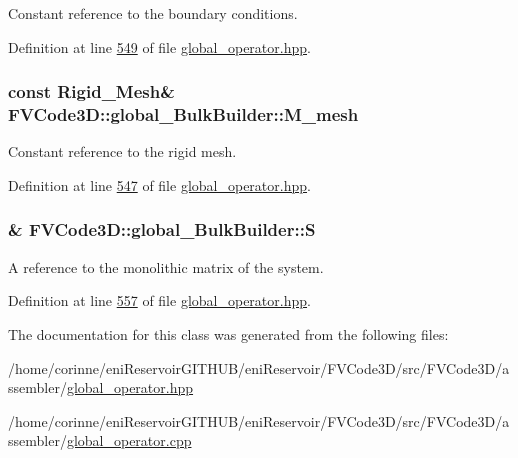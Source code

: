 Constant reference to the boundary conditions. 



Definition at line \hyperlink{global__operator_8hpp_source_l00549}{549} of file \hyperlink{global__operator_8hpp_source}{global\+\_\+operator.\+hpp}.

\subsubsection[{\texorpdfstring{M\+\_\+mesh}{M_mesh}}]{\setlength{\rightskip}{0pt plus 5cm}const {\bf Rigid\+\_\+\+Mesh}\& F\+V\+Code3\+D\+::global\+\_\+\+Bulk\+Builder\+::\+M\+\_\+mesh\hspace{0.3cm}{\ttfamily [private]}}\hypertarget{classFVCode3D_1_1global__BulkBuilder_ab7654cc72d9bb696193e1de09a8ab6c3}{}\label{classFVCode3D_1_1global__BulkBuilder_ab7654cc72d9bb696193e1de09a8ab6c3}


Constant reference to the rigid mesh. 



Definition at line \hyperlink{global__operator_8hpp_source_l00547}{547} of file \hyperlink{global__operator_8hpp_source}{global\+\_\+operator.\+hpp}.

\subsubsection[{\texorpdfstring{S}{S}}]{\& F\+V\+Code3\+D\+::global\+\_\+\+Bulk\+Builder\+::S\hspace{0.3cm}{\ttfamily [private]}}\hypertarget{classFVCode3D_1_1global__BulkBuilder_a3e29e74ddbefa92dd03bc333cc43bfd5}{}\label{classFVCode3D_1_1global__BulkBuilder_a3e29e74ddbefa92dd03bc333cc43bfd5}


A reference to the monolithic matrix of the system. 



Definition at line \hyperlink{global__operator_8hpp_source_l00557}{557} of file \hyperlink{global__operator_8hpp_source}{global\+\_\+operator.\+hpp}.



The documentation for this class was generated from the following files\+:\begin{DoxyCompactItemize}
\item 
/home/corinne/eni\+Reservoir\+G\+I\+T\+H\+U\+B/eni\+Reservoir/\+F\+V\+Code3\+D/src/\+F\+V\+Code3\+D/assembler/\hyperlink{global__operator_8hpp}{global\+\_\+operator.\+hpp}\item 
/home/corinne/eni\+Reservoir\+G\+I\+T\+H\+U\+B/eni\+Reservoir/\+F\+V\+Code3\+D/src/\+F\+V\+Code3\+D/assembler/\hyperlink{global__operator_8cpp}{global\+\_\+operator.\+cpp}\end{DoxyCompactItemize}

